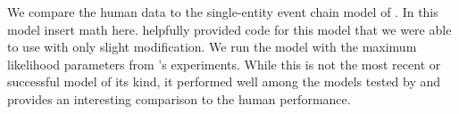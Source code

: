 \documentclass[10pt,a4paper]{article}
\newcommand{\todo}[1]{{\color{red}#1}}
\begin{document}
We compare the human data to the single-entity event chain model of . In this model \todo{insert math here}.
 helpfully provided code for this model that we were able to use with only slight modification.
We run the model with the maximum likelihood parameters from 's experiments.
While this is not the most recent or successful model of its kind, it performed well among the models tested by  and provides an interesting comparison to the human performance.
\end{document}
